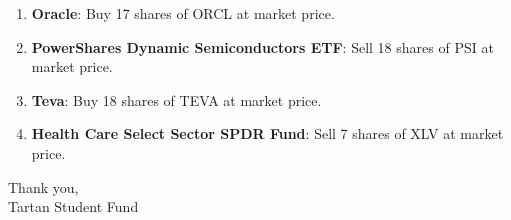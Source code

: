\documentclass[11pt,pressrelease]{newlfm} %
\begin{document}
\begin{newlfm}



\vspace{-.5 in}
\begin{singlespace} %

\begin{enumerate}
\item \textbf{Oracle}:  Buy 17 shares of ORCL at market price.

\item  \textbf{PowerShares Dynamic Semiconductors ETF}:  Sell 18 shares of PSI at market price.

\item  \textbf{Teva}:  Buy 18 shares of TEVA at market price.

\item  \textbf{Health Care Select Sector SPDR Fund}:  Sell 7 shares of XLV at market price.




\end{enumerate}


Thank you, \\
Tartan Student Fund

\end{singlespace} %


\end{newlfm}
\end{document}
